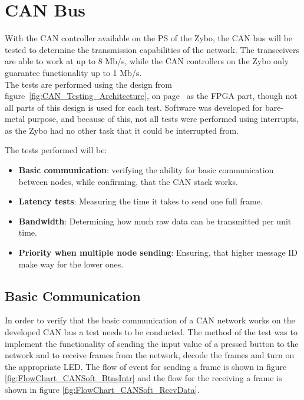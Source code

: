 
\section{CAN Bus}
\label{sub:CAN_Bus_Tests}
With the CAN controller available on the PS of the Zybo, the CAN bus will be tested to determine the transmission capabilities of the network.
The transceivers are able to work at up to 8 Mb/s, while the CAN controllers on the Zybo only guarantee functionality up to 1 Mb/s. \\

The tests are performed using the design from figure~\ref{fig:CAN_Testing_Architecture}, on page~\pageref{fig:CAN_Testing_Architecture} as the FPGA part, though not all parts of this design is used for each test.
Software was developed for bare-metal purpose, and because of this, not all tests were performed using interrupts, as the Zybo had no other task that it could be interrupted from.

The tests performed will be: 
\begin{itemize}
	\item \textbf{Basic communication}: verifying the ability for basic communication between nodes, while confirming, that the CAN stack works.
	\item \textbf{Latency tests}: Measuring the time it takes to send one full frame.
	\item \textbf{Bandwidth}: Determining how much raw data can be transmitted per unit time.
	\item \textbf{Priority when multiple node sending}: Ensuring, that higher message ID make way for the lower ones.
\end{itemize}

\subsection{Basic Communication}
\label{sub:TestingCANStack_BareMetal}


In order to verify that the basic communication of a CAN network works on the developed CAN bus a test needs to be conducted.
The method of the test was to implement the functionality of sending the input value of a pressed button to the network and to receive frames from the network, decode the frames and turn on the appropriate LED.
The flow of event for sending a frame is shown in figure \ref{fig:FlowChart_CANSoft_BtnsIntr} and the flow for the receiving a frame is shown in figure \ref{fig:FlowChart_CANSoft_RecvData}.

